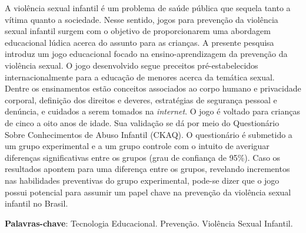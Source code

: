 
\setlength{\absparsep}{18pt} %
\begin{resumo}
   A violência sexual infantil é um problema de saúde pública que sequela tanto a vítima quanto a sociedade. Nesse sentido, jogos para prevenção da violência sexual infantil surgem com o objetivo de proporcionarem uma abordagem educacional lúdica acerca do assunto para as crianças. A presente pesquisa introduz um jogo educacional focado na ensino-aprendizagem da prevenção da violência sexual. O jogo desenvolvido segue preceitos pré-estabelecidos internacionalmente para a educação de menores acerca da temática sexual. Dentre os ensinamentos estão conceitos associados ao corpo humano e privacidade corporal, definição dos direitos e deveres, estratégias de segurança pessoal e denúncia, e cuidados a serem tomados na \textit{internet}. O jogo é voltado para crianças de cinco a oito anos de idade. Sua validação se dá por meio do Questionário Sobre Conhecimentos de Abuso Infantil (CKAQ). O questionário é submetido a um grupo experimental e a um grupo controle com o intuito de averiguar diferenças significativas entre os grupos (grau de confiança de 95\%). Caso os resultados apontem para uma diferença entre os grupos, revelando incrementos nas habilidades preventivas do grupo experimental, pode-se dizer que o jogo possui potencial para assumir um papel chave na prevenção da violência sexual infantil no Brasil.

 \textbf{Palavras-chave}: Tecnologia Educacional. Prevenção. Violência Sexual Infantil.
\end{resumo}
